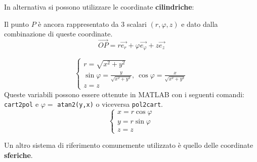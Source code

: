 In alternativa si possono utilizzare le coordinate \textbf{cilindriche}:

\begin{figure}[h] %
\centering
{}
\end{figure}

Il punto $P$ è ancora rappresentato da 3 scalari $(r,\varphi, z)$ e dato dalla combinazione di queste 
coordinate.
$$
\vec{OP} = r\vec{e_r} + \varphi\vec{e_{\varphi}} + z\vec{e_z}
$$

$$
\begin{cases}
r = \sqrt{x^2+y^2}\\
\sin\varphi = \frac{y}{\sqrt{x^2+y^2}},\ \cos\varphi = \frac{x}{\sqrt{x^2+y^2}}\\
z = z
\end{cases}
$$
Queste variabili possono essere ottenute in MATLAB con i seguenti comandi:
\verb|cart2pol| e $\varphi= $ \verb|atan2(y,x)| o viceversa \verb|pol2cart|.
$$
\begin{cases}
x = r\cos\varphi \\
y = r\sin\varphi \\
z = z
\end{cases}
$$

Un altro sistema di riferimento comunemente utilizzato è quello delle coordinate \textbf{sferiche}.

